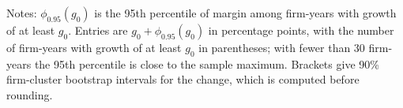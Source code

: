\begin{table}[t]\centering\small
\caption{Frontier points at fixed growth thresholds, $T(g_0)=g_0+\phi_{0.95}(g_0)$}\label{tab:threshold}
\par\vspace{2pt}\footnotesize\raggedright Notes: $\phi_{0.95}(g_0)$ is the 95th percentile of margin among firm-years with growth of at least $g_0$. Entries are $g_0+\phi_{0.95}(g_0)$ in percentage points, with the number of firm-years with growth of at least $g_0$ in parentheses; with fewer than 30 firm-years the 95th percentile is close to the sample maximum. Brackets give 90\% firm-cluster bootstrap intervals for the change, which is computed before rounding.
\end{table}
